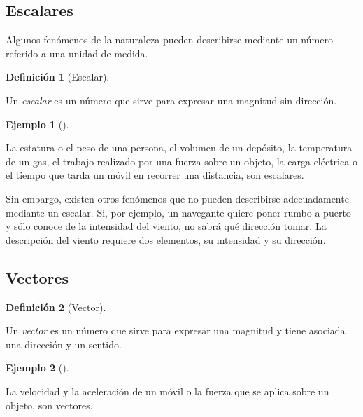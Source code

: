 \documentclass[
  a4paper,
]{scrreport}
\theoremstyle{definition}
\newtheorem{example}{Ejemplo}[chapter]
\theoremstyle{plain}
\theoremstyle{plain}
\theoremstyle{plain}
\theoremstyle{definition}
\newtheorem{definition}{Definición}[chapter]
\theoremstyle{remark}
\begin{document}
\hypertarget{escalares}{%
\subsection{Escalares}\label{escalares}}

Algunos fenómenos de la naturaleza pueden describirse mediante un número
referido a una unidad de medida.

\begin{definition}[Escalar]\protect\hypertarget{def-escalar}{}\label{def-escalar}

Un \emph{escalar} es un número que sirve para expresar una magnitud sin
dirección.

\end{definition}

\begin{example}[]\protect\hypertarget{exm-}{}\label{exm-}

La estatura o el peso de una persona, el volumen de un depósito, la
temperatura de un gas, el trabajo realizado por una fuerza sobre un
objeto, la carga eléctrica o el tiempo que tarda un móvil en recorrer
una distancia, son escalares.

\end{example}

Sin embargo, existen otros fenómenos que no pueden describirse
adecuadamente mediante un escalar. Si, por ejemplo, un navegante quiere
poner rumbo a puerto y sólo conoce de la intensidad del viento, no sabrá
qué dirección tomar. La descripción del viento requiere dos elementos,
su intensidad y su dirección.

\hypertarget{vectores}{%
\subsection{Vectores}\label{vectores}}

\begin{definition}[Vector]\protect\hypertarget{def-vector}{}\label{def-vector}

Un \emph{vector} es un número que sirve para expresar una magnitud y
tiene asociada una dirección y un sentido.

\end{definition}

\begin{example}[]\protect\hypertarget{exm-vector}{}\label{exm-vector}

La velocidad y la aceleración de un móvil o la fuerza que se aplica
sobre un objeto, son vectores.

\end{example}
\end{document}
